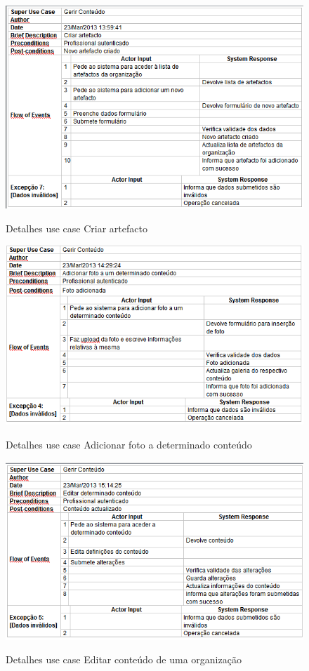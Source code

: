 ﻿\documentclass[12pt,a4paper]{article}
\begin{document}
\begin{figure}[h!]
\centering
\includegraphics[scale=0.7]{d_usecase/criarartefacto}
\label{usecase}
\caption{Detalhes use case Criar artefacto}
\end{figure}

\begin{figure}[h!]
\centering
\includegraphics[scale=0.7]{d_usecase/P_adicionarfoto}
\label{usecase}
\caption{Detalhes use case Adicionar foto a determinado conteúdo}
\end{figure}

\begin{figure}[h!]
\centering
\includegraphics[scale=0.7]{d_usecase/editarconteudo}
\label{usecase}
\caption{Detalhes use case Editar conteúdo de uma organização}
\end{figure}
\end{document}
